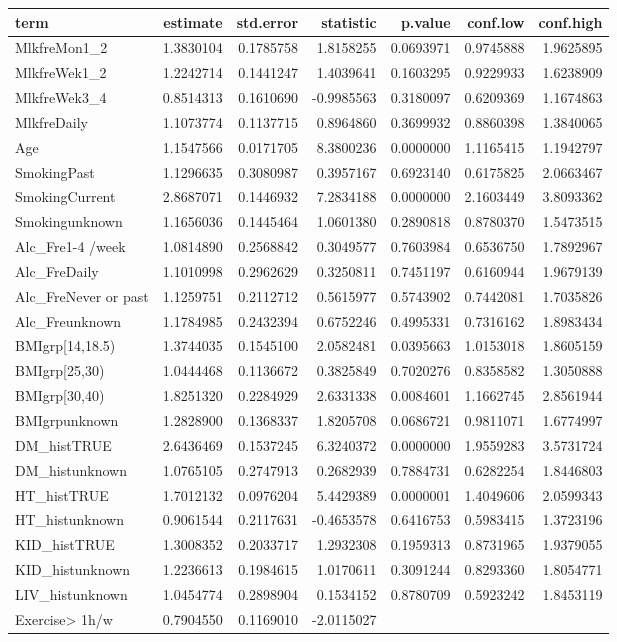 \documentclass[]{article}
\begin{document}
\begin{longtable}[]{@{}lrrrrrr@{}}
\toprule
term & estimate & std.error & statistic & p.value & conf.low &
conf.high\tabularnewline
\midrule
\endhead
MlkfreMon1\_2 & 1.3830104 & 0.1785758 & 1.8158255 & 0.0693971 &
0.9745888 & 1.9625895\tabularnewline
MlkfreWek1\_2 & 1.2242714 & 0.1441247 & 1.4039641 & 0.1603295 &
0.9229933 & 1.6238909\tabularnewline
MlkfreWek3\_4 & 0.8514313 & 0.1610690 & -0.9985563 & 0.3180097 &
0.6209369 & 1.1674863\tabularnewline
MlkfreDaily & 1.1073774 & 0.1137715 & 0.8964860 & 0.3699932 & 0.8860398
& 1.3840065\tabularnewline
Age & 1.1547566 & 0.0171705 & 8.3800236 & 0.0000000 & 1.1165415 &
1.1942797\tabularnewline
SmokingPast & 1.1296635 & 0.3080987 & 0.3957167 & 0.6923140 & 0.6175825
& 2.0663467\tabularnewline
SmokingCurrent & 2.8687071 & 0.1446932 & 7.2834188 & 0.0000000 &
2.1603449 & 3.8093362\tabularnewline
Smokingunknown & 1.1656036 & 0.1445464 & 1.0601380 & 0.2890818 &
0.8780370 & 1.5473515\tabularnewline
Alc\_Fre1-4 /week & 1.0814890 & 0.2568842 & 0.3049577 & 0.7603984 &
0.6536750 & 1.7892967\tabularnewline
Alc\_FreDaily & 1.1010998 & 0.2962629 & 0.3250811 & 0.7451197 &
0.6160944 & 1.9679139\tabularnewline
Alc\_FreNever or past & 1.1259751 & 0.2112712 & 0.5615977 & 0.5743902 &
0.7442081 & 1.7035826\tabularnewline
Alc\_Freunknown & 1.1784985 & 0.2432394 & 0.6752246 & 0.4995331 &
0.7316162 & 1.8983434\tabularnewline
BMIgrp{[}14,18.5) & 1.3744035 & 0.1545100 & 2.0582481 & 0.0395663 &
1.0153018 & 1.8605159\tabularnewline
BMIgrp{[}25,30) & 1.0444468 & 0.1136672 & 0.3825849 & 0.7020276 &
0.8358582 & 1.3050888\tabularnewline
BMIgrp{[}30,40) & 1.8251320 & 0.2284929 & 2.6331338 & 0.0084601 &
1.1662745 & 2.8561944\tabularnewline
BMIgrpunknown & 1.2828900 & 0.1368337 & 1.8205708 & 0.0686721 &
0.9811071 & 1.6774997\tabularnewline
DM\_histTRUE & 2.6436469 & 0.1537245 & 6.3240372 & 0.0000000 & 1.9559283
& 3.5731724\tabularnewline
DM\_histunknown & 1.0765105 & 0.2747913 & 0.2682939 & 0.7884731 &
0.6282254 & 1.8446803\tabularnewline
HT\_histTRUE & 1.7012132 & 0.0976204 & 5.4429389 & 0.0000001 & 1.4049606
& 2.0599343\tabularnewline
HT\_histunknown & 0.9061544 & 0.2117631 & -0.4653578 & 0.6416753 &
0.5983415 & 1.3723196\tabularnewline
KID\_histTRUE & 1.3008352 & 0.2033717 & 1.2932308 & 0.1959313 &
0.8731965 & 1.9379055\tabularnewline
KID\_histunknown & 1.2236613 & 0.1984615 & 1.0170611 & 0.3091244 &
0.8293360 & 1.8054771\tabularnewline
LIV\_histunknown & 1.0454774 & 0.2898904 & 0.1534152 & 0.8780709 &
0.5923242 & 1.8453119\tabularnewline
Exercise\textgreater{} 1h/w & 0.7904550 & 0.1169010 & -2.0115027 &

\end{longtable}
\end{document}
